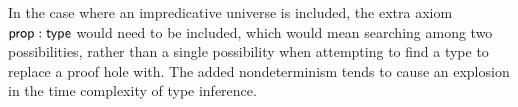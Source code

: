 In the case where an impredicative universe is included, the extra axiom $\mathsf{prop} : \mathsf{type}$ would
need to be included, which would mean searching among two possibilities, rather than a single possibility 
when attempting to find a type to replace a proof hole with. 
The added nondeterminism tends to cause an explosion in the time complexity of type inference.
